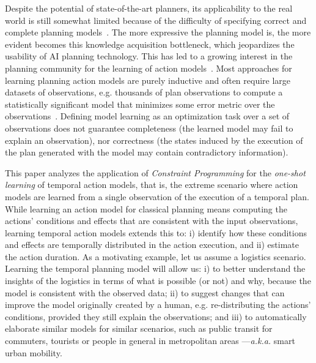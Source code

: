 \documentclass{ecai}
\begin{document}
Despite the potential of state-of-the-art planners, its applicability to the real world is still somewhat limited because of the difficulty of specifying correct and complete planning models~\cite{kambhampati2007model}. The more expressive the planning model is, the more evident becomes this knowledge acquisition bottleneck, which jeopardizes the usability of AI planning technology. This has led to a growing interest in the planning community for the learning of action models~\cite{jimenez2012review}. Most approaches for learning planning action models are purely inductive and often require large datasets of observations, e.g. thousands of plan observations to compute a statistically significant model that minimizes some error metric over the observations~\cite{yang2007learning,MouraoZPS12,zhuo2013action,kuvcera2018louga}. Defining model learning as an optimization task over a set of observations does not guarantee completeness (the learned model may fail to explain an observation), nor correctness (the states induced by the execution of the plan generated with the model may contain contradictory information).

This paper analyzes the application of {\em Constraint Programming} for the {\em one-shot learning} of temporal action models, that is, the extreme scenario where action models are learned from a single observation of the execution of a temporal plan. While learning an action model for classical planning means computing the actions' conditions and effects that are consistent with the input observations, learning temporal action models extends this to: i) identify how these conditions and effects are temporally distributed in the action execution, and ii) estimate the action duration. As a motivating example, let us assume a logistics scenario. Learning the temporal planning model will allow us: i) to better understand the insights of the logistics in terms of what is possible (or not) and why, because the model is consistent with the observed data; ii) to suggest changes that can improve the model originally created by a human, e.g. re-distributing the actions' conditions, provided they still explain the observations; and iii) to automatically elaborate
similar models for similar scenarios, such as public transit for commuters, tourists or people in general in metropolitan areas ---\emph{a.k.a.} smart urban mobility.
\end{document}
